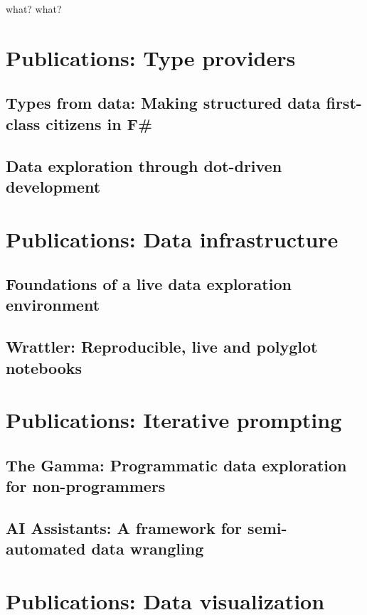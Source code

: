 \documentclass[fleqn,11pt]{report}
\theoremstyle{definition}
\begin{document}
what?
what?


\part{Publications: Type providers}
\label{part:providers}

\chapter{Types from data: Making structured data first-class citizens in F\#}
\label{ch:fsdata}

\chapter{Data exploration through dot-driven development}
\label{ch:dotdriven}

\part{Publications: Data infrastructure}
\label{part:infra}

\chapter{Foundations of a live data exploration environment}
\label{ch:foundations}

\chapter{Wrattler: Reproducible, live and polyglot notebooks}
\label{ch:wrattler}

\part{Publications: Iterative prompting}
\label{part:iterative}

\chapter{The Gamma: Programmatic data exploration for non-programmers}
\label{ch:thegamma}

\chapter{AI Assistants: A framework for semi-automated data wrangling}
\label{ch:aia}

\part{Publications: Data visualization}
\label{part:visualization}
\end{document}
